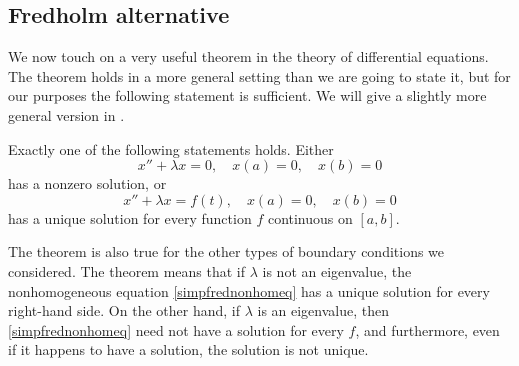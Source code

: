 %



\subsection{Fredholm alternative}

We now touch on a very useful theorem in the theory of differential
equations.  The theorem holds in a more general setting than we are
going to state it, but for our purposes the following statement is
sufficient.  We will give a slightly more general version in
.

\begin{theorem}
\label{thm:fredholmsimple}
Exactly one of the following statements holds.
Either
\begin{equation} \label{simpfredhomeq}
x'' + \lambda x = 0, \quad x(a) = 0, \quad x(b) = 0
\end{equation}
has a nonzero solution, or
\begin{equation} \label{simpfrednonhomeq}
x'' + \lambda x = f(t), \quad x(a) = 0, \quad x(b) = 0
\end{equation}
has a unique solution for every function $f$ continuous on $[a,b]$.
\end{theorem}

The theorem is also true for the other types of
boundary conditions we considered.
The theorem means that if $\lambda$ is not an eigenvalue, the nonhomogeneous
equation \eqref{simpfrednonhomeq} has a unique solution for every right-hand
side.  On the other hand, if $\lambda$ is an eigenvalue, then 
\eqref{simpfrednonhomeq} need not have a solution for every $f$,
and furthermore,
even if it happens to have a solution, the solution is not
unique.

